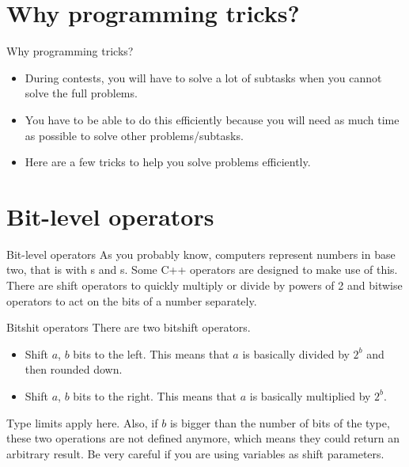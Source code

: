 \documentclass[handout,code=programming-tricks,title={Efficient
  implementation and debugging}]{../share/cpslide}
\begin{document}
\slidebegin

\section{Why programming tricks?}

\begin{frame}{Why programming tricks?}
  \begin{itemize}
  \item During contests, you will have to solve a lot of subtasks when you
    cannot solve the full problems.
  \item You have to be able to do this efficiently because you will need as much
    time as possible to solve other problems/subtasks.
  \item Here are a few tricks to help you solve problems efficiently.
  \end{itemize}
\end{frame}

\section{Bit-level operators}

\begin{frame}{Bit-level operators}
 As you probably know, computers represent numbers in base two, that is with s
 and s. Some C++ operators are designed to make use of this. There are shift
 operators to quickly multiply or divide by powers of 2 and bitwise operators to
 act on the bits of a number separately.
\end{frame}

\begin{frame}{Bitshit operators}
  There are two bitshift operators.
  \begin{itemize}
  \item {} Shift $a$, $b$ bits to the left. This means that
    $a$ is basically divided by $2^b$ and then rounded down.
  \item {} Shift $a$, $b$ bits to the right. This means that
    $a$ is basically multiplied by $2^b$.
  \end{itemize}

  \begin{warning}
    Type limits apply here. Also, if $b$ is bigger than the number of bits of the
    type, these two operations are not defined anymore, which means they could
    return an arbitrary result. Be very careful if you are using variables as
    shift parameters.
  \end{warning}
\end{frame}
\end{document}
